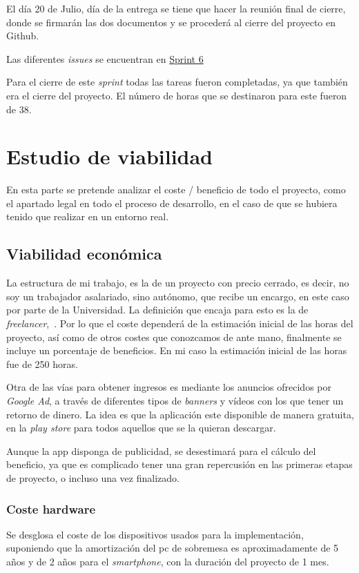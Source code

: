 El día 20 de Julio, día de la entrega se tiene que hacer la reunión final de cierre, donde se firmarán las dos documentos y se procederá al cierre del proyecto en Github.

Las diferentes \emph{issues} se encuentran en \href{https://github.com/scc0034/flutter_serpiente/milestone/6?closed=1}{Sprint 6}


Para el cierre de este \emph{sprint} todas las tareas fueron completadas, ya que también era el cierre del proyecto. El número de horas que se destinaron para este fueron de 38.


\section{Estudio de viabilidad}

En esta parte se pretende analizar el coste / beneficio de todo el proyecto, como el apartado legal en todo el proceso de desarrollo, en el caso de que se hubiera tenido que realizar en un entorno real. 


\subsection{Viabilidad económica}
La estructura de mi trabajo, es la de un proyecto con precio cerrado, es decir, no soy un trabajador asalariado, sino autónomo, que recibe un encargo, en este caso por parte de la Universidad. La definición que encaja para esto es la de \emph{freelancer},~\cite{noauthor_freelancercom_2020}. Por lo que el coste dependerá de la estimación inicial de las horas del proyecto, así como de otros costes que conozcamos de ante mano, finalmente se incluye un porcentaje de beneficios. En mi caso la estimación inicial de las horas fue de 250 horas.

Otra de las vías para obtener ingresos es mediante los anuncios ofrecidos por \emph{Google Ad}, a través de diferentes tipos de \emph{banners} y vídeos con los que tener un retorno de dinero. La idea es que la aplicación este disponible de manera gratuita, en la \emph{play store} para todos aquellos que se la quieran descargar. 

Aunque la app disponga de publicidad, se desestimará para el cálculo del beneficio, ya que es complicado tener una gran repercusión en las primeras etapas de proyecto, o incluso una vez finalizado. 	

\subsubsection{Coste hardware}
Se desglosa el coste de los dispositivos usados para la implementación, suponiendo que la amortización del pc de sobremesa es aproximadamente de 5 años y de 2 años para el \emph{smartphone}, con la duración del proyecto de 1 mes.

